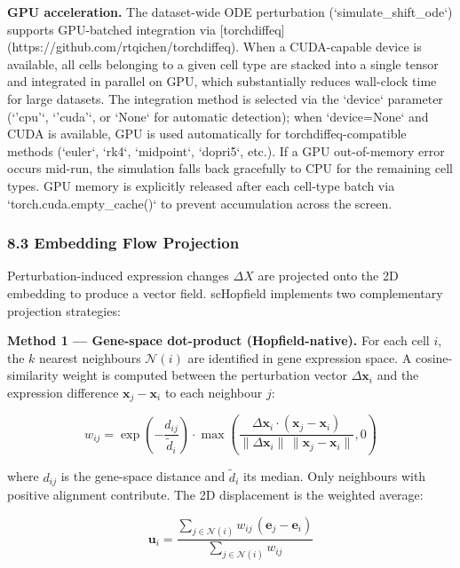 \documentclass[11pt]{article}
\begin{document}
\textbf{GPU acceleration.} The dataset-wide ODE perturbation (`simulate\_shift\_ode`) supports GPU-batched integration via [torchdiffeq](https://github.com/rtqichen/torchdiffeq). When a CUDA-capable device is available, all cells belonging to a given cell type are stacked into a single tensor and integrated in parallel on GPU, which substantially reduces wall-clock time for large datasets. The integration method is selected via the `device` parameter (`'cpu'`, `'cuda'`, or `None` for automatic detection); when `device=None` and CUDA is available, GPU is used automatically for torchdiffeq-compatible methods (`euler`, `rk4`, `midpoint`, `dopri5`, etc.). If a GPU out-of-memory error occurs mid-run, the simulation falls back gracefully to CPU for the remaining cell types. GPU memory is explicitly released after each cell-type batch via `torch.cuda.empty\_cache()` to prevent accumulation across the screen.


\subsubsection*{8.3 Embedding Flow Projection}

Perturbation-induced expression changes $\Delta X$ are projected onto the 2D embedding to produce a vector field. scHopfield implements two complementary projection strategies:

\textbf{Method 1 — Gene-space dot-product (Hopfield-native).} For each cell $i$, the $k$ nearest neighbours $\mathcal{N}(i)$ are identified in gene expression space. A cosine-similarity weight is computed between the perturbation vector $\Delta\mathbf{x}_i$ and the expression difference $\mathbf{x}_j - \mathbf{x}_i$ to each neighbour $j$:

\begin{equation}
w_{ij} = \exp\!\left(-\frac{d_{ij}}{\tilde{d}_i}\right)\cdot \max\!\left(\frac{\Delta\mathbf{x}_i \cdot (\mathbf{x}_j - \mathbf{x}_i)}{\|\Delta\mathbf{x}_i\|\,\|\mathbf{x}_j - \mathbf{x}_i\|}, 0\right)
\end{equation}

where $d_{ij}$ is the gene-space distance and $\tilde{d}_i$ its median. Only neighbours with positive alignment contribute. The 2D displacement is the weighted average:

\begin{equation}
\mathbf{u}_i = \frac{\sum_{j \in \mathcal{N}(i)} w_{ij}\,(\mathbf{e}_j - \mathbf{e}_i)}{\sum_{j \in \mathcal{N}(i)} w_{ij}} 
\end{equation}
\end{document}
